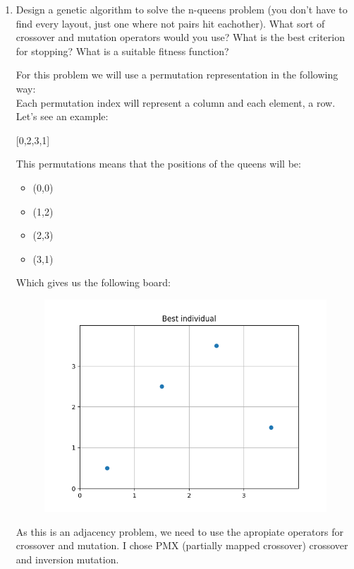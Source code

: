 \documentclass[12pt,english]{article}
\newenvironment{statement}{\fontfamily{ptm}\selectfont}{\par}
\begin{document}
\begin{enumerate}

	\item
		\begin{statement}
		Design a genetic algorithm to solve the n-queens problem (you don’t have to find every layout, just one where not pairs hit eachother). What sort of crossover and mutation operators would you use? What is the best criterion for stopping? What is a suitable fitness function?
		\end{statement}
		For this problem we will use a permutation representation in the following way:\\
		Each permutation index will represent a column and each element, a row. Let's see an example:
		\begin{center}
			[0,2,3,1]
		\end{center}
		This permutations means that the positions of the queens will be:
		\begin{itemize}
			\item (0,0)
			\item (1,2)
			\item (2,3)
			\item (3,1)
		\end{itemize}
		Which gives us the following board:
		\begin{figure}[H]
			\centering
			\includegraphics[scale=0.5]{./img/example.png}
		\end{figure}
		As this is an adjacency problem, we need to use the apropiate operators for crossover and mutation. I chose PMX (partially mapped crossover) crossover and inversion mutation.\\


\end{enumerate}
\end{document}
